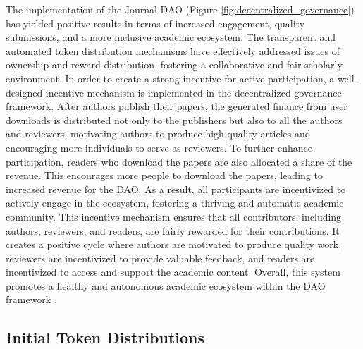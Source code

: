 \documentclass[lettersize,journal]{IEEEtran}
\begin{document}
The implementation of the Journal DAO (Figure \ref{fig:decentralized_governance}) has yielded positive results in terms of increased engagement, quality submissions, and a more inclusive academic ecosystem. The transparent and automated token distribution mechanisms have effectively addressed issues of ownership and reward distribution, fostering a collaborative and fair scholarly environment.
In order to create a strong incentive for active participation, a well-designed incentive mechanism is implemented in the decentralized governance framework. After authors publish their papers, the generated finance from user downloads is distributed not only to the publishers but also to all the authors and reviewers, motivating authors to produce high-quality articles and encouraging more individuals to serve as reviewers.
To further enhance participation, readers who download the papers are also allocated a share of the revenue. This encourages more people to download the papers, leading to increased revenue for the DAO. As a result, all participants are incentivized to actively engage in the ecosystem, fostering a thriving and automatic academic community.
This incentive mechanism ensures that all contributors, including authors, reviewers, and readers, are fairly rewarded for their contributions. It creates a positive cycle where authors are motivated to produce quality work, reviewers are incentivized to provide valuable feedback, and readers are incentivized to access and support the academic content. Overall, this system promotes a healthy and autonomous academic ecosystem within the DAO framework \cite{bolton1998corporate}.

\subsection{Initial Token Distributions}
\end{document}
